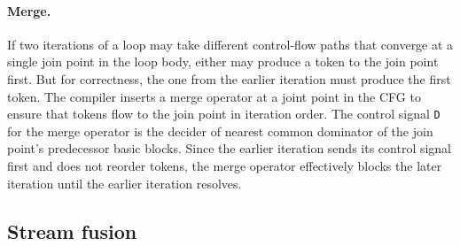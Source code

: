 \paragraph{Merge.}
%
%
If two iterations of a loop may take different control-flow
paths that converge at a single join point in the loop body, either may
produce a token to the join point first.
% 
But for correctness, the one from the
earlier iteration must produce the first token.
%
The compiler inserts a merge operator at a joint point in the CFG to ensure that 
tokens flow to the join point in iteration order.
%
The control signal {\tt D} for the merge operator is the decider of
nearest common dominator of the join point's predecessor basic blocks.
%
%
Since the earlier iteration sends its control signal first and \riptide does not reorder tokens, the merge operator effectively blocks the later iteration until the earlier iteration resolves. %
%

\figRipTideArch

\subsection{Stream fusion}
\label{sec:compiler:stream}

